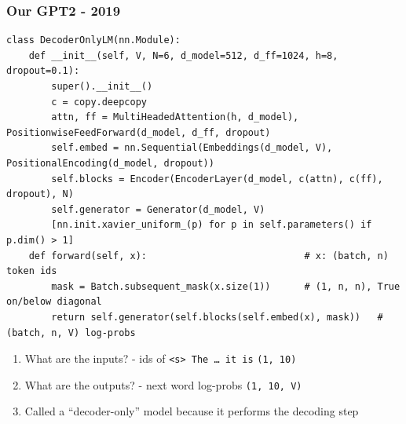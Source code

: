 \documentclass{beamer}
\newcommand{\shape}[1]{\texttt{(#1)}}
\begin{document}
\begin{frame}[fragile]
  \frametitle{Our GPT2 - 2019}
\begin{lstlisting}[basicstyle=\ttfamily\tiny,xleftmargin=-8pt,xrightmargin=-8pt]
class DecoderOnlyLM(nn.Module):
    def __init__(self, V, N=6, d_model=512, d_ff=1024, h=8, dropout=0.1):
        super().__init__()
        c = copy.deepcopy
        attn, ff = MultiHeadedAttention(h, d_model), PositionwiseFeedForward(d_model, d_ff, dropout)
        self.embed = nn.Sequential(Embeddings(d_model, V), PositionalEncoding(d_model, dropout))
        self.blocks = Encoder(EncoderLayer(d_model, c(attn), c(ff), dropout), N)
        self.generator = Generator(d_model, V)
        [nn.init.xavier_uniform_(p) for p in self.parameters() if p.dim() > 1]
    def forward(self, x):                            # x: (batch, n) token ids
        mask = Batch.subsequent_mask(x.size(1))      # (1, n, n), True on/below diagonal
        return self.generator(self.blocks(self.embed(x), mask))   # (batch, n, V) log-probs
\end{lstlisting}
  \vfill
  \footnotesize
  \begin{enumerate}
    \item<2-> What are the inputs? - ids of \texttt{<s> The \dots\ it is}
      \shape{1, 10}
    \item<3-> What are the outputs? - next word log-probs \shape{1, 10, V}
    \item<4-> Called a ``decoder-only'' model because it performs the decoding step
  \end{enumerate}
  \vfill
\end{frame}

\end{document}
